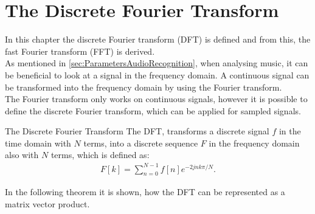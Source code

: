 \chapter{The Discrete Fourier Transform} \label{ch:DFT}
In this chapter the discrete Fourier transform (DFT) is defined and from this, the fast Fourier transform (FFT) is derived.\\

As mentioned in \autoref{sec:ParametersAudioRecognition}, when analysing music, it can be beneficial to look at a signal in the frequency domain. A continuous signal can be transformed into the frequency domain by using the Fourier transform. 
\\
The Fourier transform only works on continuous signals, however it is possible to define the discrete Fourier transform, which can be applied for sampled signals. 

\begin{definition}{The Discrete Fourier Transform}
    The DFT, transforms a discrete signal $f$ in the time domain with $N$ terms, into a discrete sequence $F$ in the frequency domain also with $N$ terms, which is defined as: 
    \begin{align*}
        F[k]=\sum^{N-1}_{n=0}f[n]e^{-2jnk\pi/N}.
    \end{align*}
    \cite[5]{rao2011fast}
    \label{def:DFT_definiton}
\end{definition}

\noindent In the following theorem it is shown, how the DFT can be represented as a matrix vector product.

